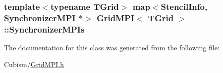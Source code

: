 \subsubsection[{Synchronizer\+M\+P\+Is}]{\setlength{\rightskip}{0pt plus 5cm}template$<$typename T\+Grid$>$ map$<${\bf Stencil\+Info}, {\bf Synchronizer\+M\+P\+I} $\ast$$>$ {\bf Grid\+M\+P\+I}$<$ T\+Grid $>$\+::Synchronizer\+M\+P\+Is\hspace{0.3cm}{\ttfamily [protected]}}\label{class_grid_m_p_i_a2630fe6ea5a92bc46e122bce621143e5}


The documentation for this class was generated from the following file\+:\begin{DoxyCompactItemize}
\item 
Cubism/\hyperlink{_grid_m_p_i_8h}{Grid\+M\+P\+I.\+h}\end{DoxyCompactItemize}
